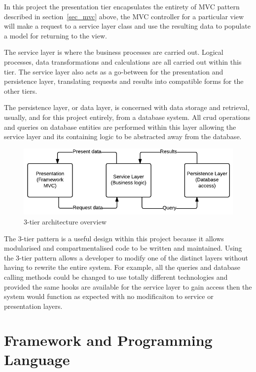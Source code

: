 In this project the presentation tier encapsulates the entirety of MVC pattern described in section~\ref{sec_mvc} above, the MVC controller for a particular view will make a request to a service layer class and use the resulting data to populate a model for returning to the view.

 The service layer is where the business processes are carried out. Logical processes, data transformations and calculations are all carried out within this tier. The service layer also acts as a go-between for the presentation and persistence layer, translating requests and results into compatible forms for the other tiers.
 
 The persistence layer, or data layer, is concerned with data storage and retrieval, usually, and for this project entirely, from a database system. All crud operations and queries on database entities are performed within this layer allowing the service layer and its containing logic to be abstracted away from the database.
\begin{figure}[H]
    \centering
    \includegraphics[width=\textwidth]{images/design/3t}
    \caption{3-tier architecture overview}
    \label{fig:3t}
\end{figure}

The 3-tier pattern is a useful design within this project because it allows modularised and compartmentalised code to be written and maintained. Using the 3-tier pattern allows a developer to modify one of the distinct layers without having to rewrite the entire system. For example, all the queries and database calling methods could be changed to use totally different technologies and provided the same hooks are available for the service layer to gain access then the system would function as expected with no modificaiton to service or presentation layers.

\section{Framework and Programming Language}\label{framework}

